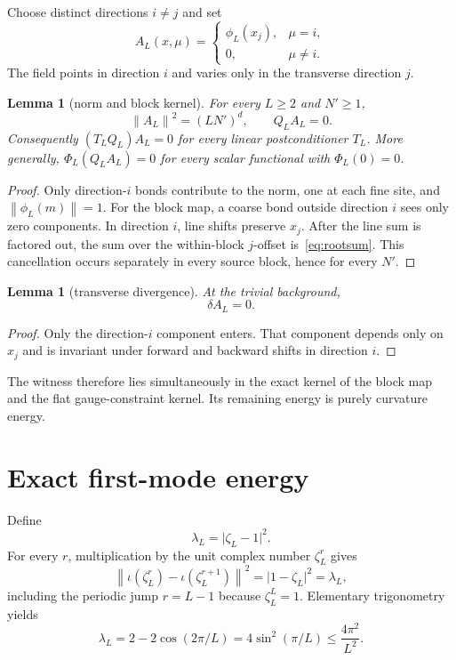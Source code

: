 \documentclass[11pt]{article}
\newtheorem{lemma}[theorem]{Lemma}
\theoremstyle{definition}
\newcommand{\norm}[1]{\left\lVert #1\right\rVert}
\begin{document}
Choose distinct directions $i\ne j$ and set
\begin{equation}\label{eq:witness}
 A_L(x,\mu)=
 \begin{cases}
 \phi_L(x_j),&\mu=i,\\
 0,&\mu\ne i.
 \end{cases}
\end{equation}
The field points in direction $i$ and varies only in the transverse direction
$j$.

\begin{lemma}[norm and block kernel]\label{lem:norm-q}
For every $L\ge2$ and $N'\ge1$,
\begin{equation}\label{eq:norm-q}
 \norm{A_L}^2=(LN')^d,
 \qquad Q_LA_L=0.
\end{equation}
Consequently $(T_LQ_L)A_L=0$ for every linear postconditioner $T_L$.
More generally, $\Phi_L(Q_LA_L)=0$ for every scalar functional with
$\Phi_L(0)=0$.
\end{lemma}

\begin{proof}
Only direction-$i$ bonds contribute to the norm, one at each fine site, and
$\norm{\phi_L(m)}=1$.  For the block map, a coarse bond outside direction $i$
sees only zero components.  In direction $i$, line shifts preserve $x_j$.
After the line sum is factored out, the sum over the within-block $j$-offset
is~\eqref{eq:rootsum}.  This cancellation occurs separately in every source
block, hence for every $N'$.
\end{proof}

\begin{lemma}[transverse divergence]\label{lem:div}
At the trivial background,
\[
 \delta A_L=0.
\]
\end{lemma}

\begin{proof}
Only the direction-$i$ component enters.  That component depends only on
$x_j$ and is invariant under forward and backward shifts in direction $i$.
\end{proof}

The witness therefore lies simultaneously in the exact kernel of the block
map and the flat gauge-constraint kernel.  Its remaining energy is purely
curvature energy.

\section{Exact first-mode energy}

Define
\begin{equation}\label{eq:lambda}
 \lambda_L=\lvert\zeta_L-1\rvert^2.
\end{equation}
For every $r$, multiplication by the unit complex number $\zeta_L^r$ gives
\begin{equation}\label{eq:jump}
 \norm{\iota(\zeta_L^r)-\iota(\zeta_L^{r+1})}^2
 =\lvert1-\zeta_L\rvert^2=\lambda_L,
\end{equation}
including the periodic jump $r=L-1$ because $\zeta_L^L=1$.  Elementary
trigonometry yields
\begin{equation}\label{eq:sin}
 \lambda_L=2-2\cos(2\pi/L)
 =4\sin^2(\pi/L)\le\frac{4\pi^2}{L^2}.
\end{equation}
\end{document}
